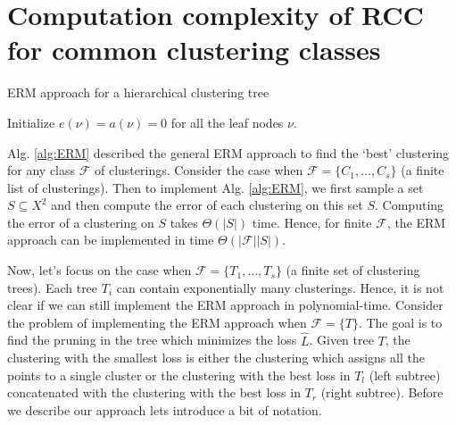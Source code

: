 \documentclass[12pt]{article}
\newcommand{\mc}{\mathcal}
\begin{document}
\section{Computation complexity of RCC for common clustering classes}
\label{section:efficientERM}

\SetAlgoNoLine
\LinesNumbered
\SetNlSkip{-0.4em}
\begin{algorithm}[h]
\caption{ERM approach for a hierarchical clustering tree}
\label{alg:ERMTrees}
\Indp{}

\vspace{0.1in} Initialize $e(\nu) = a(\nu) = 0$ for all the leaf nodes $\nu$. \\
\end{algorithm}

Alg. \ref{alg:ERM} described the general ERM approach to find the `best' clustering for any class $\mc F$ of clusterings. Consider the case when $\mc F = \{C_1, \ldots, C_s\}$ (a finite list of clusterings). Then to implement Alg. \ref{alg:ERM}, we first sample a set $S \subseteq X^2$ and then compute the error of each clustering on this set $S$. Computing the error of a clustering on $S$ takes $\Theta(|S|)$ time. Hence, for finite $\mc F$, the ERM approach can be implemented in time $\Theta(|\mc F| |S|)$. 

Now, let's focus on the case when $\mc F = \{T_1, \ldots, T_s\}$ (a finite set of clustering trees). Each tree $T_i$ can contain exponentially many clusterings. Hence, it is not clear if we can still implement the ERM approach in polynomial-time. Consider the problem of implementing the ERM approach when $\mc F = \{T\}$. The goal is to find the pruning in the tree which minimizes the loss $\hat L$. Given tree $T$, the clustering with the smallest loss is either the clustering which assigns all the points to a single cluster or the clustering with the best loss in $T_l$ (left subtree) concatenated with the clustering with the best loss in $T_r$ (right subtree). Before we describe our approach lets introduce a bit of notation.
\end{document}
